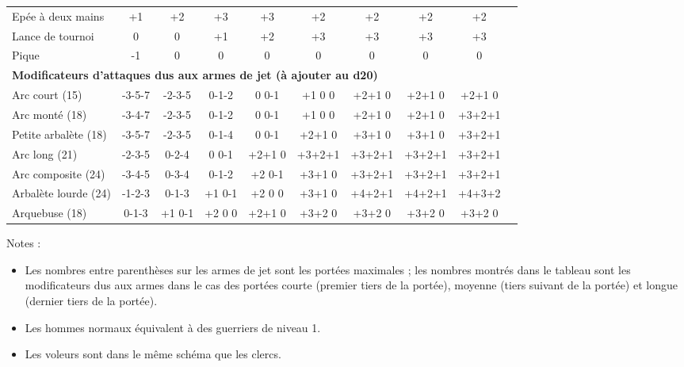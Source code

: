 \documentclass[11pt]{article}
\begin{document}
{\begin{tabular}{cccccccccccc}
\multicolumn{3}{l}{Epée à deux mains} & +1 & +2 & +3 & +3 & +2 & +2 & +2 & +2 \\
\multicolumn{3}{l}{Lance de tournoi}  &  0 &  0 & +1 & +2 & +3 & +3 & +3 & +3 \\
\multicolumn{3}{l}{Pique}             & -1 &  0 &  0 &  0 &  0 &  0 &  0 &  0 \\
\multicolumn{11}{l}{\textbf{Modificateurs d'attaques dus aux armes de jet (à ajouter au d20)}} \\
\multicolumn{3}{l}{Arc court (15)}       & \footnotesize-3-5-7 & \footnotesize-2-3-5 & \footnotesize0-1-2 & \footnotesize0 0-1 & \footnotesize+1 0 0 & \footnotesize+2+1 0 & \footnotesize+2+1 0 & \footnotesize+2+1 0 \\
\multicolumn{3}{l}{Arc monté (18)}       & \footnotesize-3-4-7 & \footnotesize-2-3-5 & \footnotesize0-1-2 & \footnotesize0 0-1 & \footnotesize+1 0 0 & \footnotesize+2+1 0 & \footnotesize+2+1 0 & \footnotesize+3+2+1 \\
\multicolumn{3}{l}{Petite arbalète (18)} & \footnotesize-3-5-7 & \footnotesize-2-3-5 & \footnotesize0-1-4 & \footnotesize0 0-1 & \footnotesize+2+1 0 & \footnotesize+3+1 0 & \footnotesize+3+1 0 & \footnotesize+3+2+1 \\
\multicolumn{3}{l}{Arc long (21)}        & \footnotesize-2-3-5 & \footnotesize 0-2-4 & \footnotesize0 0-1 &\footnotesize+2+1 0 & \footnotesize+3+2+1 & \footnotesize+3+2+1 & \footnotesize+3+2+1 & \footnotesize+3+2+1 \\
\multicolumn{3}{l}{Arc composite (24)}   & \footnotesize-3-4-5 & \footnotesize 0-3-4 & \footnotesize0-1-2 &\footnotesize+2 0-1 & \footnotesize+3+1 0 & \footnotesize+3+2+1 & \footnotesize+3+2+1 & \footnotesize+3+2+1 \\
\multicolumn{3}{l}{Arbalète lourde (24)} & \footnotesize-1-2-3 & \footnotesize 0-1-3 &\footnotesize+1 0-1 &\footnotesize+2 0 0 & \footnotesize+3+1 0 & \footnotesize+4+2+1 & \footnotesize+4+2+1 & \footnotesize+4+3+2 \\
\multicolumn{3}{l}{Arquebuse (18)}       &  \footnotesize0-1-3 & \footnotesize+1 0-1 &\footnotesize+2 0 0 &\footnotesize+2+1 0 & \footnotesize+3+2 0 & \footnotesize+3+2 0 & \footnotesize+3+2 0 & \footnotesize+3+2 0 \\
\end{tabular}

\newpage

Notes :

\bigskip

\begin{itemize}
\item Les nombres entre parenthèses sur les armes de jet sont les portées maximales ; les nombres montrés dans le tableau sont les modificateurs dus aux armes dans le cas des portées courte (premier tiers de la portée), moyenne (tiers suivant de la portée) et longue (dernier tiers de la portée).
\item Les hommes normaux équivalent à des guerriers de niveau 1.
\item Les voleurs sont dans le même schéma que les clercs.
\end{itemize}

}
\end{document}
